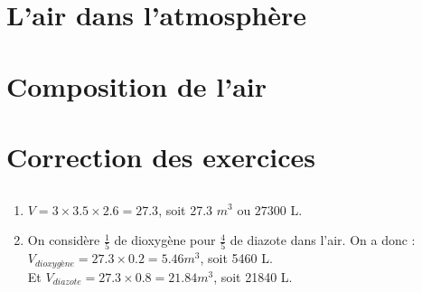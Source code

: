 \documentclass[12pt,a4paper]{article}
\begin{document}
	
	

\section{L'air dans l'atmosphère}






\section{Composition de l'air}





\begin{myexos}
\end{myexos}

\appendix

\newpage

\section*{Correction des exercices}

\subsection*{}

\begin{enumerate}[label=\alph*)]
	\item $V = 3 \times \num{3.5} \times \num{2.6} = \num{27.3}$, soit \num{27.3} $m^3$ ou $ \num{27300}$ L.
	\item On considère $\frac{1}{5}$ de dioxygène pour $\frac{4}{5}$ de diazote dans l'air.
	On a donc  :\\ $V_{dioxygène}=\num{27.3} \times \num{0.2} = \num{5.46} m^3$, soit \num{5460} L.\\
	Et $V_{diazote}=\num{27.3} \times \num{0.8} = \num{21.84} m^3$, soit \num{21840} L.
\end{enumerate}
\end{document}
